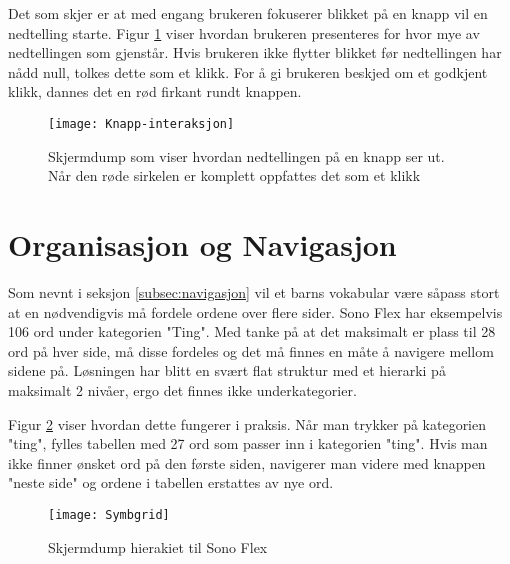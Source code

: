 Det som skjer er at med engang brukeren fokuserer blikket på en knapp vil en nedtelling starte. Figur \ref{fig:knapp-interaksjon} viser hvordan brukeren presenteres for hvor mye av nedtellingen som gjenstår.  Hvis brukeren ikke flytter blikket før nedtellingen har nådd null, tolkes dette som et klikk.
For å gi brukeren beskjed om et godkjent klikk, dannes det en rød firkant rundt knappen. 

\begin{figure}[ht!]
\centering
\texttt{[image: Knapp-interaksjon]}
\caption{Skjermdump som viser hvordan nedtellingen på en knapp ser ut. Når den røde sirkelen er komplett oppfattes det som et klikk}
\label{fig:knapp-interaksjon}
\end{figure}


\section{Organisasjon og Navigasjon}

Som nevnt i seksjon \ref{subsec:navigasjon} vil et barns vokabular være såpass stort at en nødvendigvis må fordele ordene over flere sider. Sono Flex har eksempelvis 106 ord under kategorien "Ting". Med tanke på at det maksimalt er plass til 28 ord på hver side, må disse fordeles og det må finnes en måte å navigere mellom sidene på. Løsningen har blitt en svært flat struktur med et hierarki på maksimalt 2 nivåer, ergo det finnes ikke underkategorier. 

Figur \ref{fig:hieraki-ting} viser hvordan dette fungerer i praksis. Når man trykker på kategorien "ting", fylles tabellen med 27 ord som passer inn i kategorien "ting". Hvis man ikke finner ønsket ord på den første siden, navigerer man videre med knappen "neste side" og ordene i tabellen erstattes av nye ord. 


\begin{figure}[ht!]
\centering
\texttt{[image: Symbgrid]}
\caption{Skjermdump hierakiet til Sono Flex}
\label{fig:hieraki-ting}
\end{figure}
